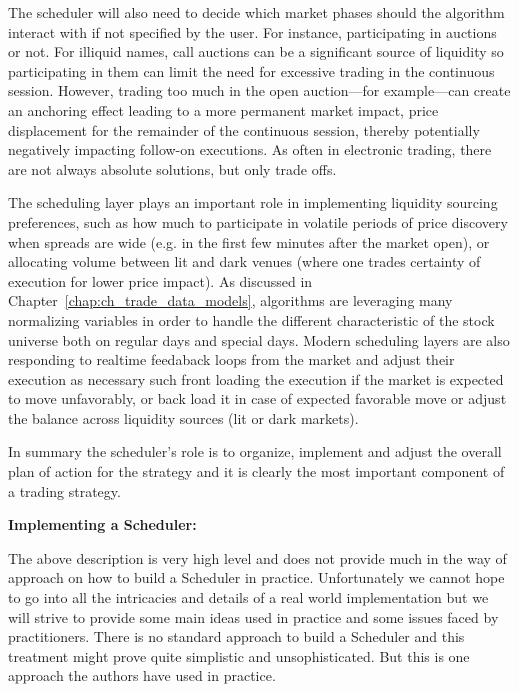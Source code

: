 The scheduler will also need to decide which market phases should the algorithm interact with if not specified by the user. For instance, participating in auctions or not. For illiquid names, call auctions can be a significant source of liquidity so participating in them can limit the need for excessive trading in the continuous session. However, trading too much in the open auction---for example---can create an anchoring effect leading to a more permanent market impact, price displacement for the remainder of the continuous session, thereby potentially negatively impacting follow-on executions. As often in electronic trading, there are not always absolute solutions, but only trade offs.


The scheduling layer plays an important role in  implementing liquidity sourcing preferences, such as how much to participate in volatile periods of price discovery when spreads are wide (e.g. in the first few minutes after the market open), or allocating volume between lit and dark venues (where one trades certainty of execution for lower price impact). As discussed in Chapter~\ref{chap:ch_trade_data_models}, algorithms are leveraging many normalizing  variables in order to handle the different characteristic of the stock universe both on regular days and special days.  Modern scheduling layers are also responding to realtime feedaback loops from the market and adjust their execution as necessary such front loading the execution if the market is expected to move unfavorably, or back load it in case of expected favorable move or adjust the balance across liquidity sources (lit or dark markets). 


In summary the scheduler's role is to organize, implement and adjust the overall plan of action for the strategy and it is clearly the most important component of a trading strategy. \twomedskip


\noindent\textbf{Implementing a Scheduler:} \twomedskip


The above description is very high level and does not provide much in the way of approach on how to build a Scheduler in practice. Unfortunately we cannot hope to go into all the intricacies and details of a real world implementation but we will strive to provide some main ideas used in practice and some issues faced by practitioners. There is no standard approach to build a Scheduler and this treatment might prove quite simplistic and unsophisticated. But this is one approach the authors have used in practice. \twomedskip



